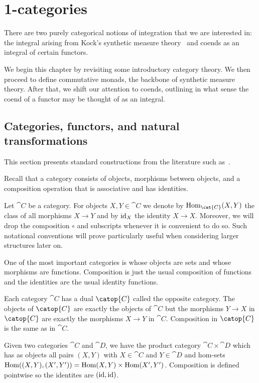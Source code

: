 \chapter{1-categories}\label{sec:synthetic_measure_theory_and_presheaves}

There are two purely categorical notions of integration that we are interested
in: the integral arising from Kock's synthetic measure theory~\cite{kock2011}
and coends as an integral of certain functors.

We begin this chapter by revisiting some introductory category theory. We then
proceed to define commutative monads, the backbone of synthetic measure theory.
After that, we shift our attention to coends, outlining in what sense the coend
of a functor may be thought of as an integral.

\section{Categories, functors, and natural transformations}\label{sec:categories}

This section presents standard constructions from the literature such as~\cite{maclane1997}.

Recall that a category consists of objects, morphisms between objects, and a
composition operation that is associative and has identities.

Let $\cat{C}$ be a category. For objects $X,Y\in\cat{C}$ we denote by
$\Hom_{\cat{C}}(X,Y)$ the class of all morphisms $X\to Y$ and by $\operatorname{id}_X$ the
identity $X\to X$. Moreover, we will drop the composition $\circ$ and
subscripts whenever it is convenient to do so. Such notational conventions will
prove particularly useful when considering larger structures later on.

One of the most important categories is \Set{} whose objects are sets and whose
morphisms are functions. Composition is just the usual composition of functions
and the identities are the usual identity functions.

Each category $\cat{C}$ has a dual $\catop{C}$ called the opposite category.
The objects of $\catop{C}$ are exactly the objects of $\cat{C}$ but the
morphisms $Y\to X$ in $\catop{C}$ are exactly the morphisms $X\to Y$ in $\cat{C}$.
Composition in $\catop{C}$ is the same as in $\cat{C}$.

Given two categories $\cat{C}$ and $\cat{D}$, we have the product category
$\cat{C}\times\cat{D}$ which has as objects all pairs $(X,Y)$ with $X\in\cat{C}$
and $Y\in\cat{D}$ and hom-sets $\operatorname{Hom}((X,Y),(X',Y'))=\operatorname{Hom}(X,Y)\times\operatorname{Hom}(X',Y')$.
Composition is defined pointwise so the identites are $(\operatorname{id},\operatorname{id})$.

